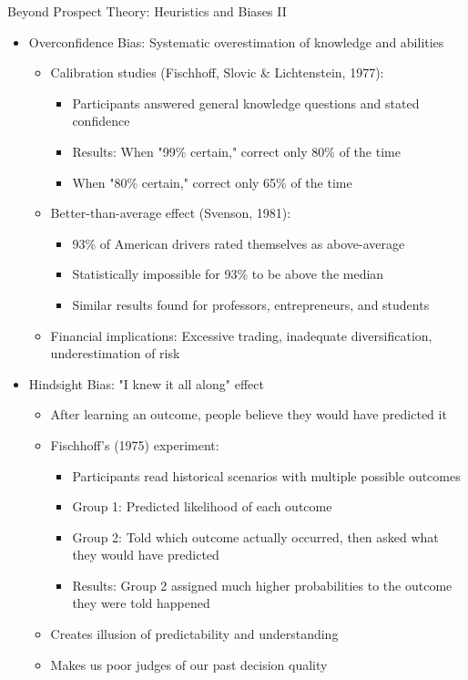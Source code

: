 \documentclass[10pt]{beamer}
\begin{document}
\begin{frame}{Beyond Prospect Theory: Heuristics and Biases II}
  \begin{itemize}[<+->]
    \item Overconfidence Bias: Systematic overestimation of knowledge and abilities
      \begin{itemize}
        \item Calibration studies (Fischhoff, Slovic \& Lichtenstein, 1977):
          \begin{itemize}
            \item Participants answered general knowledge questions and stated confidence
            \item Results: When "99\% certain," correct only 80\% of the time
            \item When "80\% certain," correct only 65\% of the time
          \end{itemize}
        \item Better-than-average effect (Svenson, 1981):
          \begin{itemize}
            \item 93\% of American drivers rated themselves as above-average
            \item Statistically impossible for 93\% to be above the median
            \item Similar results found for professors, entrepreneurs, and students
          \end{itemize}
        \item Financial implications: Excessive trading, inadequate diversification, underestimation of risk
      \end{itemize}
    \item Hindsight Bias: "I knew it all along" effect
      \begin{itemize}
        \item After learning an outcome, people believe they would have predicted it
        \item Fischhoff's (1975) experiment:
          \begin{itemize}
            \item Participants read historical scenarios with multiple possible outcomes
            \item Group 1: Predicted likelihood of each outcome
            \item Group 2: Told which outcome actually occurred, then asked what they would have predicted
            \item Results: Group 2 assigned much higher probabilities to the outcome they were told happened
          \end{itemize}
        \item Creates illusion of predictability and understanding
        \item Makes us poor judges of our past decision quality
      \end{itemize}
  \end{itemize}
\end{frame}
\end{document}
